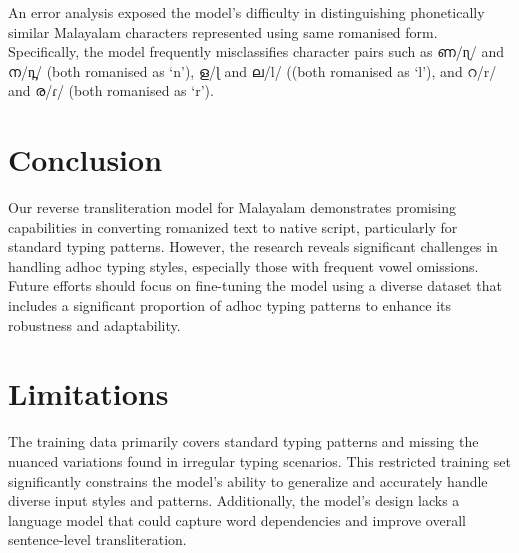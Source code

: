 \documentclass[11pt]{article}
\begin{document}
An error analysis exposed the model's difficulty in distinguishing phonetically similar Malayalam characters represented using same romanised form. Specifically, the model frequently misclassifies character pairs such as {\malayalamfont ണ}/{\ipafont ɳ}/ and {\malayalamfont ന}/{\ipafont n̪}/ (both romanised as `n'), {\malayalamfont ള}/{\ipafont ɭ} and {\malayalamfont ല}/{\ipafont l}/ ((both romanised as `l'), and {\malayalamfont റ}/{\ipafont r}/ and {\malayalamfont ര}/{\ipafont ɾ}/ (both romanised as `r'). 
\vspace{-.2cm}

\section{Conclusion}

Our reverse transliteration model for Malayalam demonstrates promising capabilities in converting romanized text to native script, particularly for standard typing patterns. However, the research reveals significant challenges in handling adhoc typing styles, especially those with frequent vowel omissions. Future efforts should focus on fine-tuning the model using a diverse dataset that includes a significant proportion of adhoc typing patterns to enhance its robustness and adaptability.


\section*{Limitations}

The training data primarily covers standard typing patterns and missing the nuanced variations found in irregular typing scenarios. This restricted training set significantly constrains the model's ability to generalize and accurately handle diverse input styles and patterns. Additionally, the model's design lacks a language model that could capture word dependencies and improve overall sentence-level transliteration. 









\appendix


\end{document}
